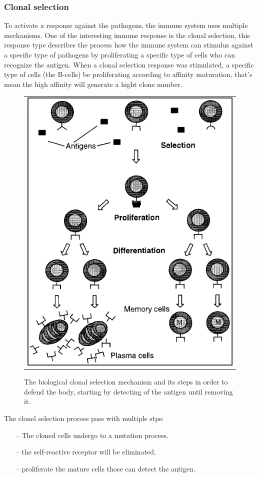 \documentclass[]{interact}
\theoremstyle{plain}%
\theoremstyle{definition}
\theoremstyle{remark}
\begin{document}
\subsubsection*{Clonal selection}
To activate a response against the pathogens, the immune system uses multiple mechanisms. One of the interesting immune response is the clonal selection, this response type describes the process how the immune system can stimulus against a specific type of pathogens by proliferating a specific type of cells who can recognize the antigen.\cite{doc7} When a clonal selection response was stimulated, a specific type of cells (the B-cells) be proliferating according to affinity maturation, that's mean the high affinity will generate a hight clone number.
\begin{figure}
\centering
\begin{tabular}{c}
\includegraphics[scale = 0.6]{clonaS}
\end{tabular}
\caption{The biological clonal selection mechanism and its steps in order to defend the body, starting by detecting of the antigen until removing it.}
\end{figure}
The clonel selection process pass with multiple stps:
\begin{enumerate}
\item[--] The cloned cells undergo to a mutation process.
\item[--] the self-reactive receptor will be eliminated.
\item[--] proliferate the mature cells those can detect the antigen.
\end{enumerate} 
\end{document}
